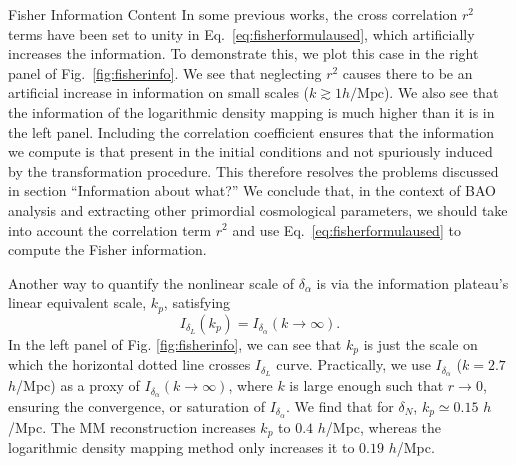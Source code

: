 \begin{section}{Fisher Information Content}
  In some previous works, the cross correlation $r^2$ terms have been set
  to unity in Eq.~\ref{eq:fisherformulaused}, which artificially
  increases the information. To demonstrate this, we plot this case in the right panel of 
  Fig.~\ref{fig:fisherinfo}.  We see that neglecting $r^2$ causes there to be an artificial 
  increase in information on small scales ($k\gtrsim 1h/\mathrm{Mpc}$).  We also see that 
  the information of the logarithmic density
  mapping is much higher than it is in the left panel.  Including the correlation coefficient 
  ensures that the information we compute is that present in the initial conditions and not 
  spuriously induced by the transformation procedure.  This therefore resolves the problems 
  discussed in \cites{bib:HarnoisD2013} section ``Information about what?''
  We conclude that, in the context of BAO analysis and extracting other primordial cosmological
  parameters, we should take into account the correlation term $r^2$ and
  use Eq.~\ref{eq:fisherformulaused} to compute the Fisher information.
  
  Another way to quantify the nonlinear scale of $\delta_\alpha$
  is via the information plateau's linear equivalent scale, $k_p$, satisfying
  \begin{equation}
      I_{\delta_L}(k_p)=I_{\delta_{\alpha}}(k\rightarrow\infty).
  \end{equation}
  In the left panel of Fig. \ref{fig:fisherinfo}, we can see that 
  $k_p$ is just the scale on which 
  the horizontal dotted line crosses $I_{\delta_{L}}$ curve.
  Practically, we use $I_{\delta_{\alpha}}$ ($k=2.7$ $h$/Mpc)
  as a proxy of $I_{\delta_{\alpha}}(k\rightarrow\infty)$,
  where $k$ is large enough such that $r\rightarrow 0$, ensuring
  the convergence, or saturation of $I_{\delta_{\alpha}}$.
  We find that
  for $\delta_N$, $k_p\simeq 0.15$ $h$/Mpc.
  The MM reconstruction increases $k_p$ to $0.4$ $h$/Mpc,
  whereas the logarithmic density mapping method only increases it to $0.19$ $h$/Mpc.


\end{section}
